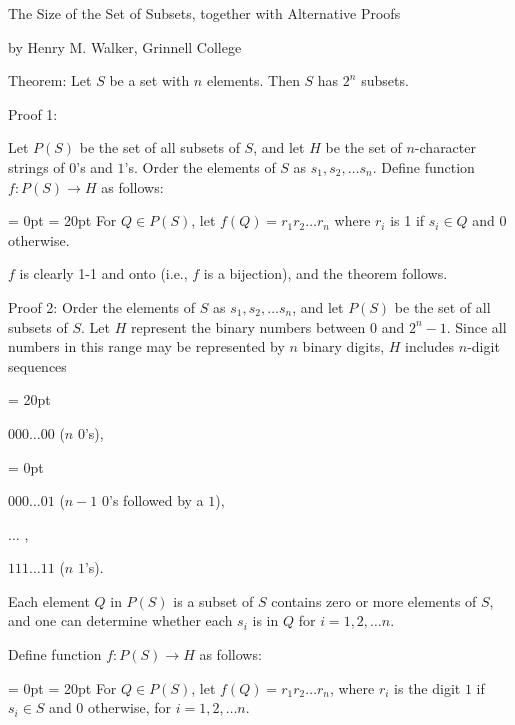 %
%
%





\centerline {\bold The Size of the Set of Subsets, together with Alternative Proofs}
\centerline {\ital by Henry M. Walker, Grinnell College}

{\bold Theorem:}  Let $S$ be a set with $n$ elements.\hfil\break
Then $S$ has $2^n$ subsets.

\bigskip
\line{\hrulefill}
\bigskip
{\bold Proof 1:}\hrulefill

Let $P(S)$ be the set of all subsets of $S$, and let $H$ be the set of $n$-character strings of $0$'s and $1$'s.\hfil\break 
Order the elements of $S$ as $s_1 , s_2, \dots s_n$.
\medskip
Define function $f: P(S) \to H$ as follows:  

{\parskip = 0pt
\parindent = 20pt
For $Q \in P(S)$, let $f(Q)=r_1 r_2 \dots r_n$ where $r_i $ is 1 if $s_i\in Q$ and $0$ otherwise.

}
\medskip
$f$ is clearly 1-1 and onto (i.e., $f$ is a bijection), and the theorem follows.

\bigskip
\line{\hrulefill}
{\bold Proof 2:}
Order the elements of $S$ as $s_1 , s_2, \dots s_n$, and let $P(S)$ be the set of all subsets of $S$.
\hfil\break
Let $H$ represent the binary numbers between $0$ and $2^n-1$.  Since all numbers in this range may be represented by $n$ binary digits, $H$ includes $n$-digit sequences

{\parindent = 20pt 
\item {}$000\dots 00$ ($n$ $0$'s), 

\parskip = 0pt
\item {}$000 \dots 01$ ($n-1$ $0$'s followed by a $1$), 
\item {}$\dots$ ,
\item {}$111\dots 11$ ($n$ $1$'s).  

}

\medskip
Each element $Q$ in $P(S)$ is a subset of $S$ contains zero or more elements of $S$, and one can determine whether each $s_i$ is in $Q$ for $i= 1, 2, \dots n$.


Define function $f: P(S) \to H$ as follows:

{\parskip = 0pt
\parindent = 20pt
For $Q \in P(S)$, let $f(Q) = r_1 r_2 \dots r_n$, where 
$r_i$ is the digit $1$ if $s_i \in S$ and $0$ otherwise, for $i= 1, 2, \dots n$.
}

